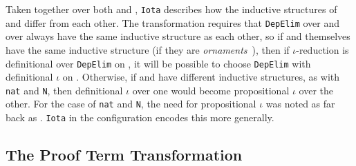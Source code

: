 Taken together over both \A and \B, \lstinline{Iota} describes how the inductive structures of \A and \B differ from each other.
The transformation requires that \lstinline{DepElim} over \A and over \B always have the same inductive structure
as each other, so if \A and \B themselves have the same 
inductive structure (if they are \textit{ornaments}~\cite{mcbride}),
then if $\iota$-reduction is definitional over \lstinline{DepElim} on \A, it will be possible to choose
\lstinline{DepElim} with definitional $\iota$ on \B.
Otherwise, if \A and \B have different inductive structures, as with \lstinline{nat} and \lstinline{N},
then definitional $\iota$ over one would become propositional $\iota$ over the other.
For the case of \lstinline{nat} and \lstinline{N},
the need for propositional $\iota$ was noted as far back as \citet{magaud2000changing}.
\lstinline{Iota} in the configuration encodes this more generally.

\subsection{The Proof Term Transformation}
\label{sec:generic}

